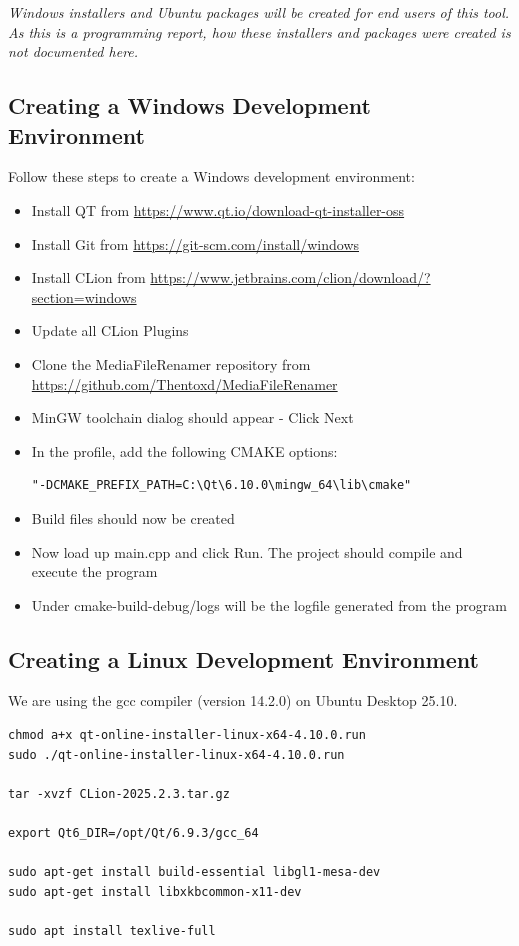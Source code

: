 \documentclass[11pt]{article}
\begin{document}
\linebreak
\linebreak
\textit{Windows installers and Ubuntu packages will be created for end users of this tool.
As this is a programming report, how these installers and packages were created is not documented here.}

\subsection{Creating a Windows Development Environment}
Follow these steps to create a Windows development environment:
\begin{itemize}
    \item Install QT from \url{https://www.qt.io/download-qt-installer-oss}
    \item Install Git from \url{https://git-scm.com/install/windows}
    \item Install CLion from \url{https://www.jetbrains.com/clion/download/?section=windows}
    \item Update all CLion Plugins
    \item Clone the MediaFileRenamer repository from \url{https://github.com/Thentoxd/MediaFileRenamer}
    \item MinGW toolchain dialog should appear - Click Next
    \item In the profile, add the following CMAKE options: \begin{verbatim}"-DCMAKE_PREFIX_PATH=C:\Qt\6.10.0\mingw_64\lib\cmake"\end{verbatim}
    \item Build files should now be created
    \item Now load up main.cpp and click Run. The project should compile and execute the program
    \item Under cmake-build-debug/logs will be the logfile generated from the program
\end{itemize}




\subsection{Creating a Linux Development Environment}

We are using the gcc compiler (version 14.2.0) on Ubuntu Desktop 25.10.


\begin{lstlisting}
chmod a+x qt-online-installer-linux-x64-4.10.0.run
sudo ./qt-online-installer-linux-x64-4.10.0.run

tar -xvzf CLion-2025.2.3.tar.gz

export Qt6_DIR=/opt/Qt/6.9.3/gcc_64

sudo apt-get install build-essential libgl1-mesa-dev
sudo apt-get install libxkbcommon-x11-dev

sudo apt install texlive-full
\end{lstlisting}
\end{document}
